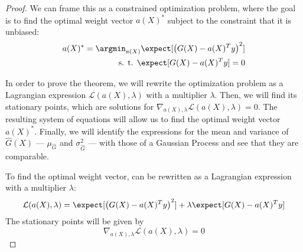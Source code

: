 \begin{proof}
    We can frame this as a constrained optimization problem, where the goal is to find the optimal weight vector $a(X)^*$ subject to the constraint that it is unbiased:
    \begin{align}
        a(X)^*=\argmin_{a(X)}\expect[\left(G(X)-a(X)^Ty\right)^2] & \nonumber \\
        \text{s. t. } \expect[G(X)-a(X)^Ty] = 0 &
        \label{eq:optimization_app}
    \end{align}
    
    In order to prove the theorem, we will rewrite the optimization problem as a Lagrangian expression $\mathcal{L}(a(X), \lambda)$ with a multiplier $\lambda$. Then, we will find its stationary points, which are solutions for $\nabla_{a(X),\lambda}\mathcal{L}(a(X), \lambda) = 0$. The resulting system of equations will allow us to find the optimal weight vector $a(X)^*$. Finally, we will identify the expressions for the mean and variance of $\hat{G}(X)$ --- $\mu_{\hat{G}}$ and $\sigma^2_{\hat{G}}$ --- with those of a Gaussian Process and see that they are comparable.

    To find the optimal weight vector,  can be rewritten as a Lagrangian expression with a multiplier $\lambda$:
    \begin{equation}
        \mathcal{L}(a(X), \lambda)=\expect[\left(G(X)-a(X)^Ty\right)^2] + \lambda \expect[G(X)-a(X)^Ty]
    \end{equation}
    The stationary points will be given by 
    \begin{equation}
        \nabla_{a(X),\lambda}\mathcal{L}(a(X), \lambda) = 0 %
        \label{eq:lagrangian_nabla}
    \end{equation}


\end{proof}
